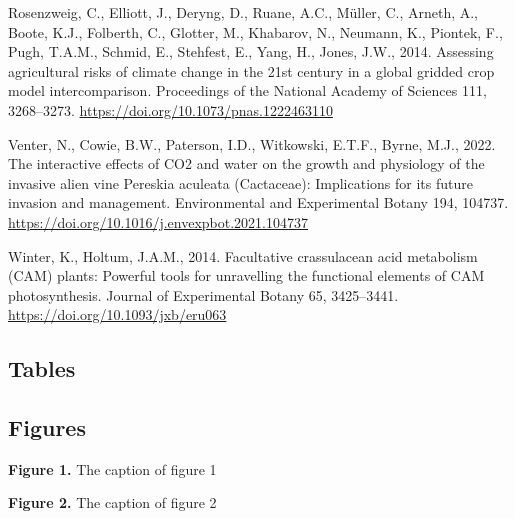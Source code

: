 \documentclass[
  12pt,
  letterpaper,
  DIV=11,
  numbers=noendperiod]{scrartcl}
\newlength{\cslhangindent}
\newlength{\cslentryspacingunit} %
\newenvironment{CSLReferences}[2] %
 {%
  \setlength{\parindent}{0pt}
  \ifodd #1
  \let\oldpar\par
  \def\par{\hangindent=\cslhangindent\oldpar}
  \fi
  \setlength{\parskip}{#2\cslentryspacingunit}
 }%
 {}
\begin{document}
\begin{CSLReferences}{1}{0}
\leavevmode{}%
Rosenzweig, C., Elliott, J., Deryng, D., Ruane, A.C., Müller, C.,
Arneth, A., Boote, K.J., Folberth, C., Glotter, M., Khabarov, N.,
Neumann, K., Piontek, F., Pugh, T.A.M., Schmid, E., Stehfest, E., Yang,
H., Jones, J.W., 2014. Assessing agricultural risks of climate change in
the 21st century in a global gridded crop model intercomparison.
Proceedings of the National Academy of Sciences 111, 3268--3273.
\url{https://doi.org/10.1073/pnas.1222463110}

\leavevmode{}%
Venter, N., Cowie, B.W., Paterson, I.D., Witkowski, E.T.F., Byrne, M.J.,
2022. The interactive effects of {CO2} and water on the growth and
physiology of the invasive alien vine {Pereskia} aculeata ({Cactaceae}):
{Implications} for its future invasion and management. Environmental and
Experimental Botany 194, 104737.
\url{https://doi.org/10.1016/j.envexpbot.2021.104737}

\leavevmode{}%
Winter, K., Holtum, J.A.M., 2014. Facultative crassulacean acid
metabolism ({CAM}) plants: {Powerful} tools for unravelling the
functional elements of {CAM} photosynthesis. Journal of Experimental
Botany 65, 3425--3441. \url{https://doi.org/10.1093/jxb/eru063}

\end{CSLReferences}

\newpage

\hypertarget{tables}{%
\subsection{Tables}\label{tables}}

\hypertarget{figures}{%
\subsection{Figures}\label{figures}}

\textbf{Figure 1.} The caption of figure 1

\newpage

\textbf{Figure 2.} The caption of figure 2
\end{document}
